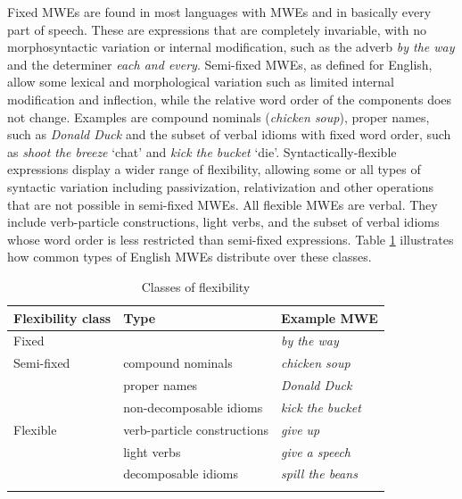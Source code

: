 \documentclass[output=paper]{langsci/langscibook}
\begin{document}
Fixed MWEs are found in most languages with MWEs and in basically every part of speech.
These are expressions that are completely invariable, with no morphosyntactic variation or internal modification, such as the adverb \emph{by the way} and the determiner \emph{each and every}. 
Semi-fixed MWEs, as defined for English, allow some lexical and morphological variation such as limited internal modification and inflection, while the relative word order of the components does not change.  
Examples are compound nominals (\emph{chicken soup}), proper names, such as \emph{Donald Duck} and the subset of verbal idioms with fixed word order, such as \emph{shoot the breeze} `chat' and \emph{kick the bucket} `die'.
Syntactically-flexible expressions display a wider range of flexibility, allowing some or all types of syntactic variation including passivization, relativization and other operations that are not possible in semi-fixed MWEs.
All flexible MWEs are verbal. 
They include verb-particle constructions, light verbs, and the subset of verbal idioms whose word order is less restricted than semi-fixed expressions. 
Table \ref{tab:mweiness:flexibilityclasses} illustrates how common types of English MWEs distribute over these classes.

\begin{table}
  \begin{tabular}{lll}
    \lsptoprule
    \textbf{Flexibility class} & \textbf{Type} & \textbf{Example MWE} \\
    \midrule
	Fixed &  & \emph{by the way} \\\hline	
	Semi-fixed & compound nominals  & \emph{chicken soup} \\
	& proper names & \emph{Donald Duck} \\
	& non-decomposable idioms & \emph{kick the bucket} \\\hline
	Flexible & verb-particle constructions &  \emph{give up} \\
	& light verbs & \emph{give a speech} \\
	& decomposable idioms & \emph{spill the beans} \\
    \lspbottomrule
  \end{tabular}
  \caption{Classes of flexibility}
  \label{tab:mweiness:flexibilityclasses}
\end{table}
\end{document}
